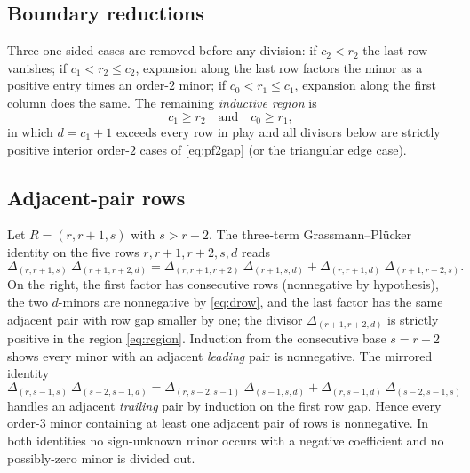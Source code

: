 \documentclass[11pt]{amsart}
\theoremstyle{definition}
\theoremstyle{remark}
\newcommand{\minor}[2]{\Delta_{#1}^{#2}}
\begin{document}
\subsection{Boundary reductions}
Three one-sided cases are removed before any division: if $c_2<r_2$ the
last row vanishes; if $c_1<r_2\le c_2$, expansion along the last row
factors the minor as a positive entry times an order-$2$ minor; if
$c_0<r_1\le c_1$, expansion along the first column does the same. The
remaining \emph{inductive region} is
\begin{equation}\label{eq:region}
c_1\ge r_2\quad\text{and}\quad c_0\ge r_1 ,
\end{equation}
in which $d=c_1+1$ exceeds every row in play and all divisors below are
strictly positive interior order-$2$ cases of \eqref{eq:pf2gap} (or the
triangular edge case).

\subsection{Adjacent-pair rows}
Let $R=(r,r+1,s)$ with $s>r+2$. The three-term Grassmann--Pl\"ucker
identity on the five rows $r,r+1,r+2,s,d$ reads
\begin{equation}\label{eq:pl5}
\minor{(r,r+1,s)}{}\ \minor{(r+1,r+2,d)}{}
= \minor{(r,r+1,r+2)}{}\ \minor{(r+1,s,d)}{}
+ \minor{(r,r+1,d)}{}\ \minor{(r+1,r+2,s)}{} .
\end{equation}
On the right, the first factor has consecutive rows (nonnegative by
hypothesis), the two $d$-minors are nonnegative by \eqref{eq:drow}, and
the last factor has the same adjacent pair with row gap smaller by one;
the divisor $\minor{(r+1,r+2,d)}{}$ is strictly positive in the region
\eqref{eq:region}. Induction from the consecutive base $s=r+2$ shows
every minor with an adjacent \emph{leading} pair is nonnegative. The
mirrored identity
\begin{equation}\label{eq:pl6}
\minor{(r,s-1,s)}{}\ \minor{(s-2,s-1,d)}{}
= \minor{(r,s-2,s-1)}{}\ \minor{(s-1,s,d)}{}
+ \minor{(r,s-1,d)}{}\ \minor{(s-2,s-1,s)}{}
\end{equation}
handles an adjacent \emph{trailing} pair by induction on the first row
gap. Hence every order-$3$ minor containing at least one adjacent pair
of rows is nonnegative. In both identities no sign-unknown minor occurs
with a negative coefficient and no possibly-zero minor is divided out.
\end{document}
